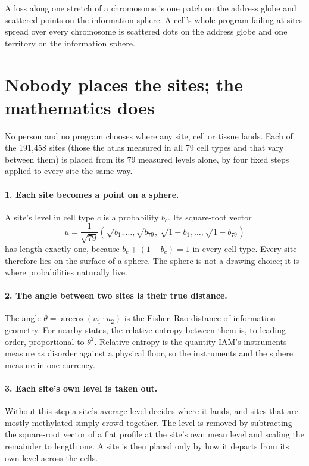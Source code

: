 A loss along one stretch of a chromosome is one patch on the address globe and scattered points on the information sphere. A cell's
whole program failing at sites spread over every chromosome is scattered dots on the address globe and one territory on the information
sphere.

\section{Nobody places the sites; the mathematics does}

No person and no program chooses where any site, cell or tissue lands. Each of the 191{,}458 sites (those the atlas measured in all 79
cell types and that vary between them) is placed from its 79 measured levels alone, by four fixed steps applied to every site the same way.

\paragraph{1. Each site becomes a point on a sphere.} A site's level in cell type $c$ is a probability $b_c$. Its square-root vector
\begin{equation}
u = \frac{1}{\sqrt{79}}\left(\sqrt{b_1},\dots,\sqrt{b_{79}},\ \sqrt{1-b_1},\dots,\sqrt{1-b_{79}}\right)
\end{equation}
has length exactly one, because $b_c + (1-b_c) = 1$ in every cell type. Every site therefore lies on the surface of a sphere. The sphere
is not a drawing choice; it is where probabilities naturally live.

\paragraph{2. The angle between two sites is their true distance.} The angle $\theta = \arccos(u_1\cdot u_2)$ is the Fisher--Rao
distance of information geometry. For nearby states, the relative entropy between them is, to leading order, proportional to $\theta^2$.
Relative entropy is the quantity IAM's instruments measure as disorder against a physical floor, so the instruments and the sphere
measure in one currency.

\paragraph{3. Each site's own level is taken out.} Without this step a site's average level decides where it lands, and sites that are
mostly methylated simply crowd together. The level is removed by subtracting the square-root vector of a flat profile at the site's own
mean level and scaling the remainder to length one. A site is then placed only by how it departs from its own level across the cells.

